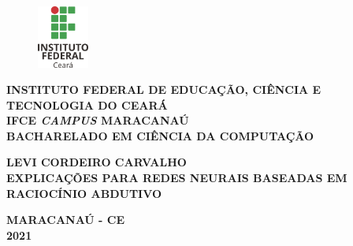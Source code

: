 \begin{titlepage}
  \begin{figure}[htb]			
	  \centering
	  \includegraphics[width=0.15\textwidth]{figuras/ifce.png}
  \end{figure}
  \begin{center}
    \textbf{INSTITUTO FEDERAL DE EDUCAÇÃO, CIÊNCIA E TECNOLOGIA DO CEARÁ}\\
    \textbf{IFCE \textit{CAMPUS} MARACANAÚ}\\
    \textbf{BACHARELADO EM CIÊNCIA DA COMPUTAÇÃO}\\

  \end{center}

 
\centering
	\begin{center}
	
		\vfill
		\textbf{LEVI CORDEIRO CARVALHO \\} 
\vfill
		\textbf{EXPLICAÇÕES PARA REDES NEURAIS BASEADAS EM RACIOCÍNIO ABDUTIVO}\\
		
		
		
		
	\end{center}
	 \vfill
		
			\textbf{MARACANAÚ - CE \\ 2021}
\end{titlepage}
